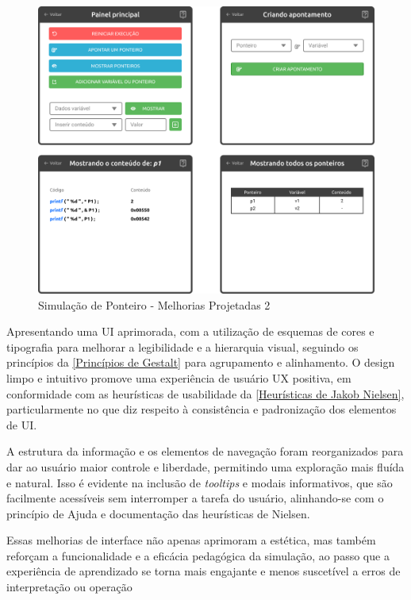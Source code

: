\begin{figure}[htb]
    \begin{center}
        \includegraphics[scale=0.25]{figs/debugandoED-ponteiro-depois-02.png}
    \end{center}
    \caption{\label{debugandoED-ponteiro-depois-02}Simulação de Ponteiro - Melhorias Projetadas 2}
\end{figure}

Apresentando uma \ac{UI} aprimorada, com a utilização de esquemas de cores e tipografia para melhorar a legibilidade e a hierarquia visual, seguindo os princípios da \autoref{Princípios de Gestalt} para agrupamento e alinhamento. O design limpo e intuitivo promove uma experiência de usuário \ac{UX} positiva, em conformidade com as heurísticas de usabilidade da \autoref{Heurísticas de Jakob Nielsen}, particularmente no que diz respeito à consistência e padronização dos elementos de \ac{UI}.

A estrutura da informação e os elementos de navegação foram reorganizados para dar ao usuário maior controle e liberdade, permitindo uma exploração mais fluída e natural. Isso é evidente na inclusão de \textit{tooltips} e modais informativos, que são facilmente acessíveis sem interromper a tarefa do usuário, alinhando-se com o princípio de Ajuda e documentação das heurísticas de Nielsen.

Essas melhorias de interface não apenas aprimoram a estética, mas também reforçam a funcionalidade e a eficácia pedagógica da simulação, ao passo que a experiência de aprendizado se torna mais engajante e menos suscetível a erros de interpretação ou operação

